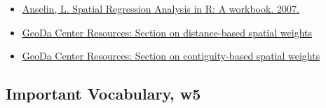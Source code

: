 \documentclass[
]{book}
\providecommand{\tightlist}{%
  \setlength{\itemsep}{0pt}\setlength{\parskip}{0pt}}
\begin{document}
\begin{itemize}
\tightlist
\item
  \href{https://dces.wisc.edu/wp-content/uploads/sites/128/2013/08/W14_Anselin2007.pdf}{Anselin, L. Spatial Regression Analysis in R: A workbook. 2007.}
\item
  \href{https://geodacenter.github.io/workbook/4b_dist_weights/lab4b.html}{GeoDa Center Resources: Section on distance-based spatial weights}
\item
  \href{https://geodacenter.github.io/workbook/4a_contig_weights/lab4a.html}{GeoDa Center Resources: Section on contiguity-based spatial weights}
\end{itemize}

\hypertarget{important-vocabulary-w5}{%
\subsection{Important Vocabulary, w5}\label{important-vocabulary-w5}}

 
  \providecommand{\huxb}[2]{\arrayrulecolor[RGB]{#1}\global\arrayrulewidth=#2pt}
  \providecommand{\huxvb}[2]{\color[RGB]{#1}\vrule width #2pt}
  \providecommand{\huxtpad}[1]{\rule{0pt}{#1}}
  \providecommand{\huxbpad}[1]{\rule[-#1]{0pt}{#1}}
\end{document}
